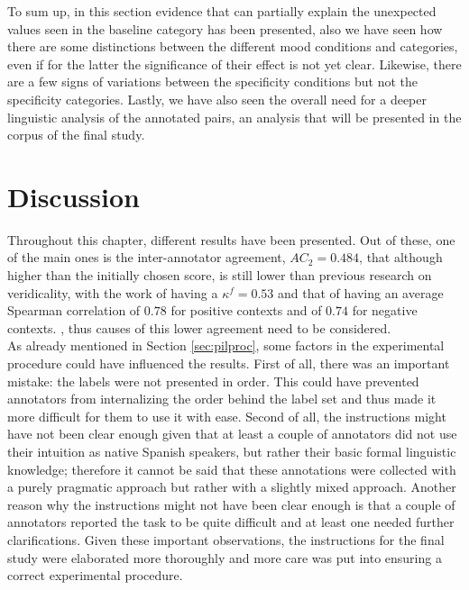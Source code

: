 To sum up, in this section evidence that can partially explain the unexpected values seen in the baseline category has been presented, also we have seen how there are some distinctions between the different mood conditions and categories, even if for the latter the significance of their effect is not yet clear. Likewise, there are a few signs of variations between the specificity conditions but not the specificity categories. Lastly, we have also seen the overall need for a deeper linguistic analysis of the annotated pairs, an analysis that will be presented in the corpus of the final study.\\

\section{Discussion}
\label{sect:pildisc}
Throughout this chapter, different results have been presented. Out of these, one of the main ones is the inter-annotator agreement, $AC_2=0.484$, that although higher than the initially chosen score, is still lower than previous research on veridicality, with the work of \citet{de2012did} having a $\kappa^f=0.53$ and that of \citet{ross2019well} having an average Spearman correlation of $0.78$ for positive contexts and of $0.74$ for negative contexts. , thus causes of this lower agreement need to be considered.\\

As already mentioned in Section \ref{sec:pilproc}, some factors in the experimental procedure could have influenced the results. First of all, there was an important mistake: the labels were not presented in order. This could have prevented annotators from internalizing the order behind the label set and thus made it more difficult for them to use it with ease. Second of all, the instructions might have not been clear enough given that at least a couple of annotators did not use their intuition as native Spanish speakers, but rather their basic formal linguistic knowledge; therefore it cannot be said that these annotations were collected with a purely pragmatic approach but rather with a slightly mixed approach. Another reason why the instructions might not have been clear enough is that a couple of annotators reported the task to be quite difficult and at least one needed further clarifications. Given these important observations, the instructions for the final study were elaborated more thoroughly and more care was put into ensuring a correct experimental procedure.\\

